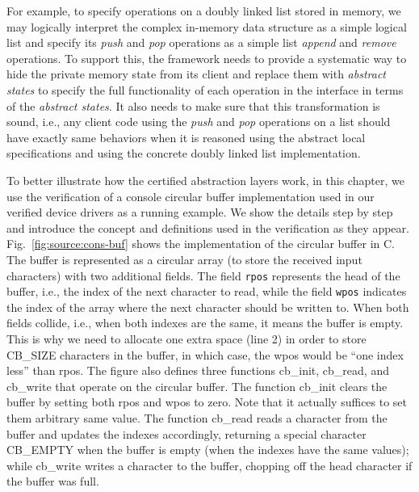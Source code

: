 For example, to specify operations on a doubly
linked list stored in memory, we may logically interpret the complex in-memory
data structure as a simple logical list and specify its {\em push} and {\em pop}
operations as a simple list {\em append} and {\em remove} operations. To support
this, the framework needs to provide a systematic way to hide the private memory
state from its client and replace them with {\em abstract states} to specify
the full functionality of each operation in the interface in terms of the {\em
abstract states}. It also needs to make sure that this transformation is
sound, i.e., any client code using the {\em push} and {\em pop} operations
on a list should have exactly same behaviors when it is reasoned using the
abstract local specifications and using the concrete doubly linked list
implementation.



To better illustrate how the certified abstraction layers work,
in this chapter, we use the verification of a console
circular buffer implementation used in our verified device drivers
as a running example. We show the details step by step and introduce
the concept and definitions used in the verification as they appear.
Fig.~\ref{fig:source:cons-buf} shows the implementation of the circular
buffer in C. The buffer is represented as a circular array
(to store the received input characters) with two additional
fields. The field \texttt{rpos} represents the head of the buffer,
i.e., the index of the next character to read, while the field
\texttt{wpos} indicates the index of the array where the next character
should be written to. When both fields collide, i.e., when both
indexes are the same, it means the buffer is empty. This is why we need
to allocate one extra space (line 2) in order to store \textsf{CB\_SIZE}
characters in the buffer, in which case, the \textsf{wpos} would be
``one index less'' than \textsf{rpos}. 
The figure also defines three functions
\textsf{cb\_init}, \textsf{cb\_read}, and \textsf{cb\_write} that operate
on the circular buffer. The function \textsf{cb\_init} clears the buffer
by setting both \textsf{rpos} and \textsf{wpos} to zero. Note that
it actually suffices to set them arbitrary same value. The function
\textsf{cb\_read} reads a character from the buffer and updates the
indexes accordingly, returning a special character \textsf{CB\_EMPTY}
when the buffer is empty (when the indexes have the same values);
while \textsf{cb\_write} writes a character to the buffer, chopping
off the head character if the buffer was full.


